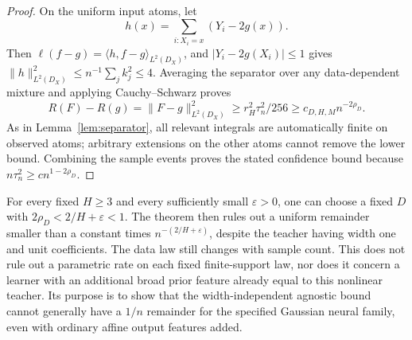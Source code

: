 \begin{proof}
On the uniform input atoms, let
\[
 h(x)=\sum_{i:X_i=x}(Y_i-2g(x)).
\]
Then $\ell(f-g)=\langle h,f-g\rangle_{L^2(D_X)}$, and $|Y_i-2g(X_i)|\le1$ gives
$\|h\|_{L^2(D_X)}^2\le n^{-1}\sum_jk_j^2\le4$.
Averaging the separator over any data-dependent mixture and applying Cauchy--Schwarz proves
\[
 R(F)-R(g)=\|F-g\|_{L^2(D_X)}^2
 \ge r_H^2\tau_n^2/256\ge c_{D,H,M}n^{-2\rho_D}.
\]
As in Lemma~\ref{lem:separator}, all relevant integrals are automatically finite on observed atoms; arbitrary extensions on the other atoms cannot remove the lower bound. Combining the sample events proves the stated confidence bound because $n\tau_n^2\ge c n^{1-2\rho_D}$.
\end{proof}

For every fixed $H\ge3$ and every sufficiently small $\varepsilon>0$, one can choose a fixed $D$ with $2\rho_D<2/H+\varepsilon<1$. The theorem then rules out a uniform remainder smaller than a constant times $n^{-(2/H+\varepsilon)}$, despite the teacher having width one and unit coefficients. The data law still changes with sample count. This does not rule out a parametric rate on each fixed finite-support law, nor does it concern a learner with an additional broad prior feature already equal to this nonlinear teacher. Its purpose is to show that the width-independent agnostic bound cannot generally have a $1/n$ remainder for the specified Gaussian neural family, even with ordinary affine output features added.
